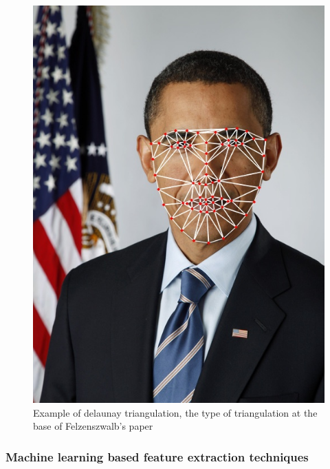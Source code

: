 \documentclass[conference]{IEEEtran}
\begin{document}
				\begin{figure}[!ht]
					\centerline{\includegraphics[height=0.3\textheight]{imgs/delaunay.jpg}}
					\caption{Example of delaunay triangulation, the type of triangulation at the base of Felzenszwalb's paper}
					\label{fig:3}
				\end{figure}
				
			\subsubsection{Machine learning based feature extraction techniques} \label{mlfe}
				
\end{document}
